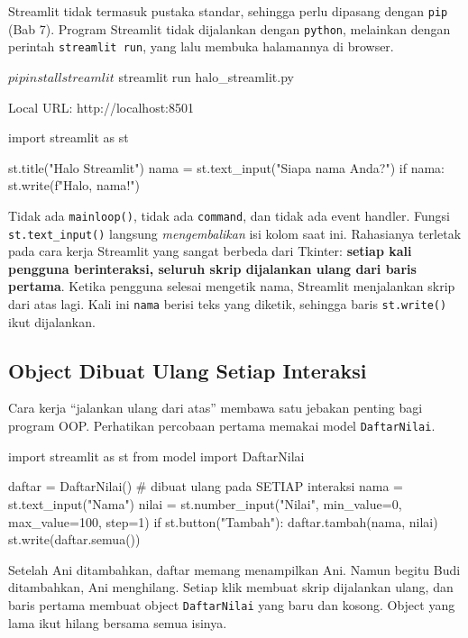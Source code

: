 Streamlit tidak termasuk pustaka standar, sehingga perlu dipasang dengan \texttt{pip} (Bab 7). Program Streamlit tidak dijalankan dengan \texttt{python}, melainkan dengan perintah \texttt{streamlit run}, yang lalu membuka halamannya di browser.

\begin{keluaran}[Terminal]
$ pip install streamlit
$ streamlit run halo_streamlit.py

  Local URL: http://localhost:8501
\end{keluaran}

\begin{kode}
import streamlit as st

st.title("Halo Streamlit")
nama = st.text_input("Siapa nama Anda?")
if nama:
    st.write(f"Halo, {nama}!")
\end{kode}

Tidak ada \texttt{mainloop()}, tidak ada \texttt{command}, dan tidak ada event handler. Fungsi \texttt{st.text\_input()} langsung \emph{mengembalikan} isi kolom saat ini. Rahasianya terletak pada cara kerja Streamlit yang sangat berbeda dari Tkinter: \textbf{setiap kali pengguna berinteraksi, seluruh skrip dijalankan ulang dari baris pertama}. Ketika pengguna selesai mengetik nama, Streamlit menjalankan skrip dari atas lagi. Kali ini \texttt{nama} berisi teks yang diketik, sehingga baris \texttt{st.write()} ikut dijalankan.

\subsection{Object Dibuat Ulang Setiap Interaksi}

Cara kerja ``jalankan ulang dari atas'' membawa satu jebakan penting bagi program OOP. Perhatikan percobaan pertama memakai model \texttt{DaftarNilai}.

\begin{kode}
import streamlit as st
from model import DaftarNilai

daftar = DaftarNilai()                  # dibuat ulang pada SETIAP interaksi
nama = st.text_input("Nama")
nilai = st.number_input("Nilai", min_value=0, max_value=100, step=1)
if st.button("Tambah"):
    daftar.tambah(nama, nilai)
st.write(daftar.semua())
\end{kode}

Setelah Ani ditambahkan, daftar memang menampilkan Ani. Namun begitu Budi ditambahkan, Ani menghilang. Setiap klik membuat skrip dijalankan ulang, dan baris pertama membuat object \texttt{DaftarNilai} yang baru dan kosong. Object yang lama ikut hilang bersama semua isinya.

